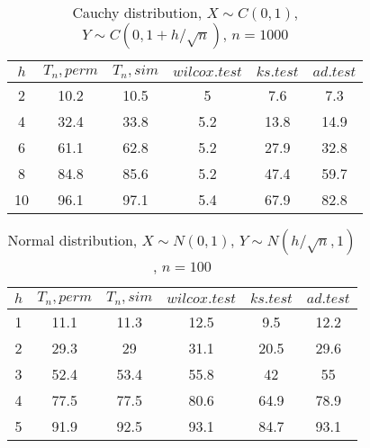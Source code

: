 \documentclass{svproc}
\begin{document}
\begin{table}
  \caption{Cauchy distribution, $X\sim C(0,1)$, $Y\sim C(0, 1 + h/\sqrt{n})$, $n=1000$}
  \begin{center}
  \begin{tabular}{c@{\quad}c@{\quad}c@{\quad}c@{\quad}c@{\quad}c}
  $h$ & $T_n, perm$ & $T_n, sim$ & $wilcox.test$ & $ks.test$ & $ad.test$ \\
  \hline
  2 & 10.2 & 10.5 & 5 & 7.6 & 7.3 \\
  4 & 32.4 & 33.8 & 5.2 & 13.8 & 14.9 \\
  6 & 61.1 & 62.8 & 5.2 & 27.9 & 32.8 \\
  8 & 84.8 & 85.6 & 5.2 & 47.4 & 59.7 \\
  10 & 96.1 & 97.1 & 5.4 & 67.9 & 82.8 \\
  \hline
  \end{tabular}
  \end{center}
\end{table}


\begin{table}
  \caption{Normal distribution, $X\sim N(0,1)$, $Y\sim N(h/\sqrt{n},1)$, $n=100$}
  \begin{center}
  \begin{tabular}{c@{\quad}c@{\quad}c@{\quad}c@{\quad}c@{\quad}c}
  \hline
  $h$ & $T_n, perm$ & $T_n, sim$ & $wilcox.test$ & $ks.test$ & $ad.test$ \\
  \hline
  1 & 11.1 & 11.3 & 12.5 & 9.5 & 12.2 \\
  2 & 29.3 & 29 & 31.1 & 20.5 & 29.6 \\
  3 & 52.4 & 53.4 & 55.8 & 42 & 55 \\
  4 & 77.5 & 77.5 & 80.6 & 64.9 & 78.9 \\
  5 & 91.9 & 92.5 & 93.1 & 84.7 & 93.1 \\
  \hline
  \end{tabular}
  \end{center}
\end{table}
\end{document}
